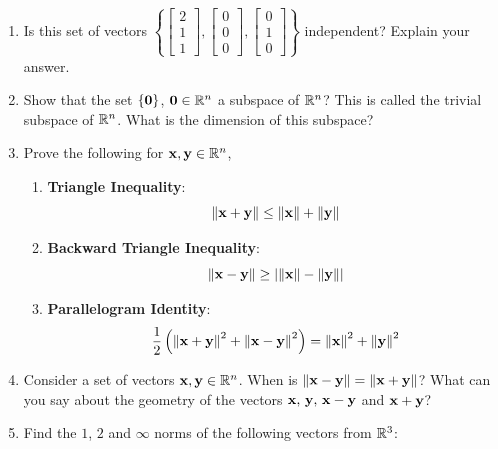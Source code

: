 \begin{enumerate}
    \item Is this set of vectors $\left\{\begin{bmatrix}2 \\ 1 \\ 1\end{bmatrix}, \begin{bmatrix}0 \\ 0\\ 0\end{bmatrix}, \begin{bmatrix}0 \\ 1 \\ 0\end{bmatrix}\right\}$ independent? Explain your answer.
    
    \item Show that the set $\left\{ \mathbf{0} \right\}$, $\mathbf{0} \in \mathbb{R}^n$ a subspace of $\mathbb{R}^n$? This is called the trivial subspace of $\mathbb{R}^n$. What is the dimension of this subspace?
    
    \item Prove the following for $\mathbf{x}, \mathbf{y} \in \mathbb{R}^n$,
    \begin{enumerate}
        \item {\small \textbf{Triangle Inequality}}:
        \[ \left\lVert \mathbf{x} + \mathbf{y}\right\rVert \leq \left\lVert \mathbf{x}\right\rVert + \left\lVert \mathbf{y}\right\rVert \]
        \item {\small \textbf{Backward Triangle Inequality}}:
        \[ \left\lVert \mathbf{x} - \mathbf{y}\right\rVert  \geq \left\lvert \left\lVert \mathbf{x}\right\rVert - \left\lVert \mathbf{y}\right\rVert \right\rvert \]
        \item {\small \textbf{Parallelogram Identity}}:
        \[ \frac{1}{2} \left(\left\lVert \mathbf{x} + \mathbf{y}\right\rVert^2 + \left\lVert \mathbf{x} - \mathbf{y}\right\rVert^2 \right) = \left\lVert \mathbf{x}\right\rVert^2 + \left\lVert \mathbf{y}\right\rVert^2 \]
    \end{enumerate}

    \item Consider a set of vectors $\mathbf{x}, \mathbf{y} \in \mathbb{R}^n$. When is $\left\lVert \mathbf{x} - \mathbf{y} \right\rVert = \left\lVert \mathbf{x} + \mathbf{y}\right\rVert$? What can you say about the geometry of the vectors $\mathbf{x},\,\mathbf{y},\,\mathbf{x} - \mathbf{y}$ and $\mathbf{x} + \mathbf{y}$? 
    
    \item Find the $1$, $2$ and $\infty$ norms of the following vectors from $\mathbb{R}^3$:
    

\end{enumerate}
